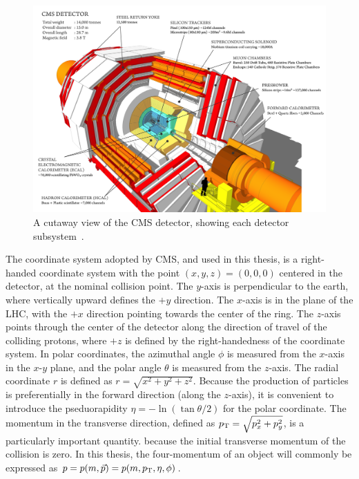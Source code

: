 \begin{figure}[htbp]
  \centering
   \includegraphics[width=\textwidth]{figures/LHCandCMS/CMScutaway.png}
  \caption{
    A cutaway view of the CMS detector, showing each detector 
    subsystem~\cite{1742-6596-513-2-022032}.
        }
 \label{fig:CMScutaway}
\end{figure}

The coordinate system adopted by CMS, and used in this thesis,
is a right-handed coordinate system with the point $(x, y, z) = (0, 0, 0)$
centered in the detector, at the nominal collision point. The $y$-axis 
is perpendicular to the earth, where vertically upward defines the $+y$ direction.
The $x$-axis is in the plane of the LHC, with the $+x$ direction pointing towards
the center of the ring. The $z$-axis points through the center of the detector
along the direction of travel of the colliding protons, where $+z$ is defined
by the right-handedness of the coordinate system. In polar coordinates, 
the azimuthal angle $\phi$ is measured from the $x$-axis in the $x$-$y$
plane, and the polar angle $\theta$ is measured from the $z$-axis. The radial
coordinate $r$ is defined as $r = \sqrt{x^2 + y^2 + z^2}$.
Because the production of 
particles is preferentially in the forward direction (along
the $z$-axis), it is convenient to introduce the pseduorapidity $\eta = - \ln(\tan{\theta/2})$
for the polar coordinate. The momentum in the transverse direction,
defined as $p_{\mathrm{T}} = \sqrt{p_{x}^2 + p_{y}^2}$, is a particularly important quantity.
because the initial transverse momentum of the collision is zero.
In this thesis, the four-momentum of an object will commonly be expressed as
$p = p(m, \vec{p}) = p(m, p_{\mathrm{T}}, \eta, \phi)$.

